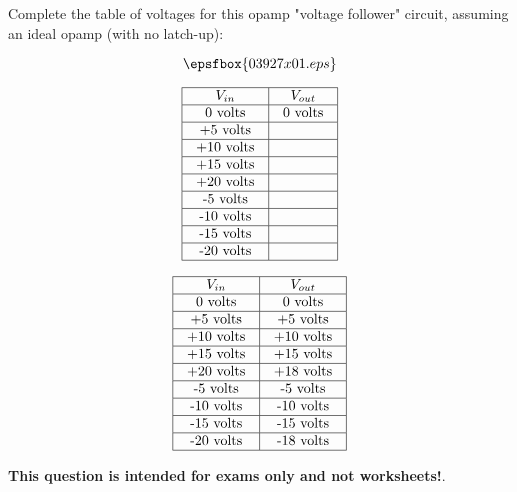 

Complete the table of voltages for this opamp "voltage follower" circuit, assuming an ideal opamp (with no latch-up):

$$\epsfbox{03927x01.eps}$$


$$\vbox{\offinterlineskip
\halign{\strut
\vrule \quad\hfil # \ \hfil & 
\vrule \quad\hfil # \ \hfil \vrule \cr
\noalign{\hrule}
%
$V_{in}$ & $V_{out}$ \cr
%
\noalign{\hrule}
%
0 volts & 0 volts \cr
%
\noalign{\hrule}
%
+5 volts &  \cr
%
\noalign{\hrule}
%
+10 volts &  \cr
%
\noalign{\hrule}
%
+15 volts &  \cr
%
\noalign{\hrule}
%
+20 volts &  \cr
%
\noalign{\hrule}
%
-5 volts &  \cr
%
\noalign{\hrule}
%
-10 volts &  \cr
%
\noalign{\hrule}
%
-15 volts &  \cr
%
\noalign{\hrule}
%
-20 volts &  \cr
%
\noalign{\hrule}
} %
}$$ %








$$\vbox{\offinterlineskip
\halign{\strut
\vrule \quad\hfil # \ \hfil & 
\vrule \quad\hfil # \ \hfil \vrule \cr
\noalign{\hrule}
%
$V_{in}$ & $V_{out}$ \cr
%
\noalign{\hrule}
%
0 volts & 0 volts \cr
%
\noalign{\hrule}
%
+5 volts & +5 volts \cr
%
\noalign{\hrule}
%
+10 volts & +10 volts \cr
%
\noalign{\hrule}
%
+15 volts & +15 volts \cr
%
\noalign{\hrule}
%
+20 volts & +18 volts \cr
%
\noalign{\hrule}
%
-5 volts & -5 volts \cr
%
\noalign{\hrule}
%
-10 volts & -10 volts \cr
%
\noalign{\hrule}
%
-15 volts & -15 volts \cr
%
\noalign{\hrule}
%
-20 volts & -18 volts \cr
%
\noalign{\hrule}
} %
}$$ %







{\bf This question is intended for exams only and not worksheets!}.



